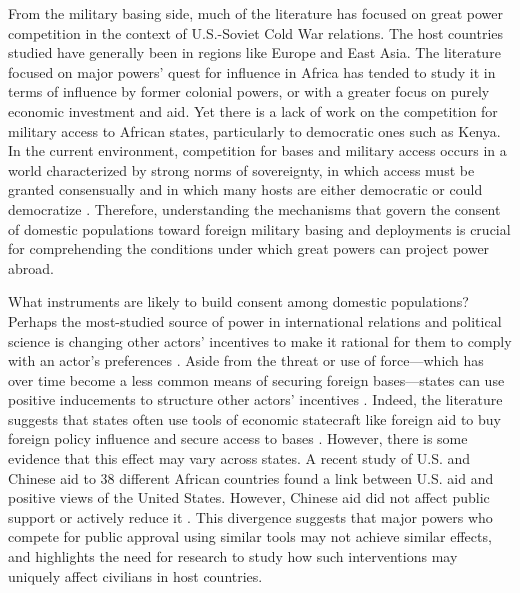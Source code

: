 From the military basing side, much of the literature has focused on great power competition in the context of U.S.-Soviet Cold War relations. The host countries studied have generally been in regions like Europe and East Asia. The literature focused on major powers' quest for influence in Africa has tended to study it in terms of influence by former colonial powers, or with a greater focus on purely economic investment and aid. Yet there is a lack of work on the competition for military access to African states, particularly to democratic ones such as Kenya. In the current environment, competition for bases and military access occurs in a world characterized by strong norms of sovereignty, in which access must be granted consensually and in which many hosts are either democratic or could democratize \cite{Cooley2008,schmidt2020}. Therefore, understanding the mechanisms that govern the consent of domestic populations toward foreign military basing and deployments is crucial for comprehending the conditions under which great powers can project power abroad. 

What instruments are likely to build consent among domestic populations? Perhaps the most-studied source of power in international relations and political science is changing other actors' incentives to make it rational for them to comply with an actor's preferences \cite{dahl1961}. Aside from the threat or use of force—which has over time become a less common means of securing foreign bases—states can use positive inducements to structure other actors' incentives \cite{schmidt2020,Lake1996}. Indeed, the literature suggests that states often use tools of economic statecraft like foreign aid to buy foreign policy influence and secure access to bases \cite{carter2015,alexander2019,blankenship2020,joyce2023}. However, there is some evidence that this effect may vary across states. A recent study of U.S. and Chinese aid to 38 different African countries found a link between U.S. aid and positive views of the United States. However, Chinese aid did not affect public support or actively reduce it \cite{blair2022}. This divergence suggests that major powers who compete for public approval using similar tools may not achieve similar effects, and highlights the need for research to study how such interventions may uniquely affect civilians in host countries.

